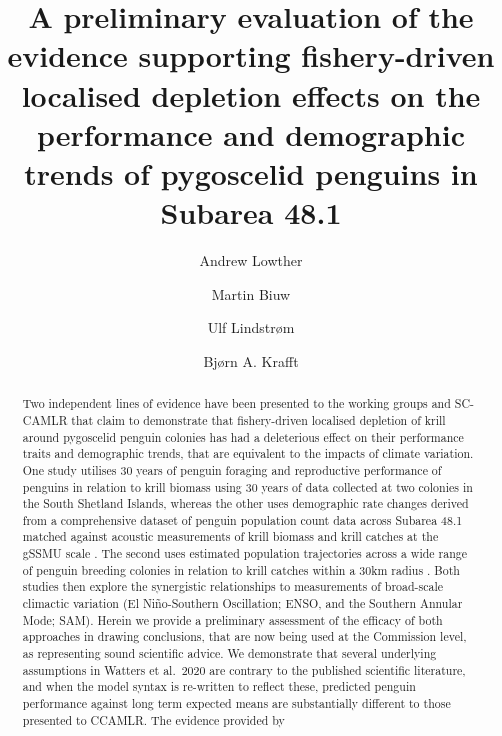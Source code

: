 \documentclass[]{elsarticle} %
\begin{document}
\begin{frontmatter}

  \title{A preliminary evaluation of the evidence supporting
fishery-driven localised depletion effects on the performance and
demographic trends of pygoscelid penguins in Subarea 48.1}
    \author[]{Andrew Lowther%
  }
    \author[Institute of Marine Research (Tromsø)]{Martin Biuw%
  }
    \author[Institute of Marine Research (Tromsø)]{Ulf Lindstrøm%
  }
    \author[Institute of Marine Research (Bergen)]{Bjørn A. Krafft%
  }
  
  \begin{abstract}
  Two independent lines of evidence have been presented to the working
  groups and SC-CAMLR that claim to demonstrate that fishery-driven
  localised depletion of krill around pygoscelid penguin colonies has
  had a deleterious effect on their performance traits and demographic
  trends, that are equivalent to the impacts of climate variation. One
  study utilises 30 years of penguin foraging and reproductive
  performance of penguins in relation to krill biomass using 30 years of
  data collected at two colonies in the South Shetland Islands, whereas
  the other uses demographic rate changes derived from a comprehensive
  dataset of penguin population count data across Subarea 48.1 matched
  against acoustic measurements of krill biomass and krill catches at
  the gSSMU scale \citep{Watters2020}. The second uses estimated
  population trajectories across a wide range of penguin breeding
  colonies in relation to krill catches within a 30km radius
  \citep{Kruger2021}. Both studies then explore the synergistic
  relationships to measurements of broad-scale climactic variation (El
  Niño-Southern Oscillation; ENSO, and the Southern Annular Mode; SAM).
  Herein we provide a preliminary assessment of the efficacy of both
  approaches in drawing conclusions, that are now being used at the
  Commission level, as representing sound scientific advice. We
  demonstrate that several underlying assumptions in Watters et al.~2020
  are contrary to the published scientific literature, and when the
  model syntax is re-written to reflect these, predicted penguin
  performance against long term expected means are substantially
  different to those presented to CCAMLR. The evidence provided by

\end{abstract}
\end{frontmatter}
\end{document}
